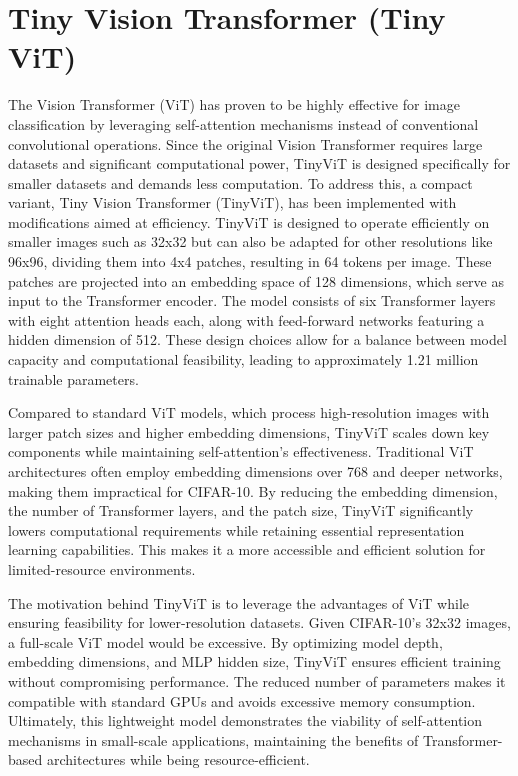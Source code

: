 \section{Tiny Vision Transformer (Tiny ViT)}

The Vision Transformer (ViT) has proven to be highly effective for image classification by leveraging self-attention mechanisms instead of conventional convolutional operations. Since the original Vision Transformer requires large datasets and significant computational power, TinyViT is designed specifically for smaller datasets and demands less computation. To address this, a compact variant, Tiny Vision Transformer (TinyViT), has been implemented with modifications aimed at efficiency. TinyViT is designed to operate efficiently on smaller images such as 32x32 but can also be adapted for other resolutions like 96x96, dividing them into 4x4 patches, resulting in 64 tokens per image. These patches are projected into an embedding space of 128 dimensions, which serve as input to the Transformer encoder. The model consists of six Transformer layers with eight attention heads each, along with feed-forward networks featuring a hidden dimension of 512. These design choices allow for a balance between model capacity and computational feasibility, leading to approximately 1.21 million trainable parameters.

Compared to standard ViT models, which process high-resolution images with larger patch sizes and higher embedding dimensions, TinyViT scales down key components while maintaining self-attention’s effectiveness. Traditional ViT architectures often employ embedding dimensions over 768 and deeper networks, making them impractical for CIFAR-10. By reducing the embedding dimension, the number of Transformer layers, and the patch size, TinyViT significantly lowers computational requirements while retaining essential representation learning capabilities. This makes it a more accessible and efficient solution for limited-resource environments.

The motivation behind TinyViT is to leverage the advantages of ViT while ensuring feasibility for lower-resolution datasets. Given CIFAR-10’s 32x32 images, a full-scale ViT model would be excessive. By optimizing model depth, embedding dimensions, and MLP hidden size, TinyViT ensures efficient training without compromising performance. The reduced number of parameters makes it compatible with standard GPUs and avoids excessive memory consumption. Ultimately, this lightweight model demonstrates the viability of self-attention mechanisms in small-scale applications, maintaining the benefits of Transformer-based architectures while being resource-efficient.

